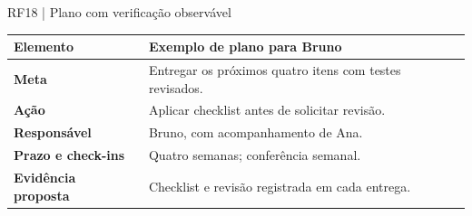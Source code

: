 \documentclass[aspectratio=169,t,xcolor=table]{beamer}
\newcommand{\head}[1]{\textcolor{UFGBlue}{\textbf{#1}}}
\begin{document}
\begin{frame}{RF18 | Plano com verificação observável}

\small
\begin{tabularx}{\textwidth}{@{}L{.24\textwidth}Y@{}}
\toprule\head{Elemento} & \head{Exemplo de plano para Bruno}\\\midrule
\textbf{Meta} & Entregar os próximos quatro itens com testes revisados.\\[.1cm]
\textbf{Ação} & Aplicar checklist antes de solicitar revisão.\\[.1cm]
\textbf{Responsável} & Bruno, com acompanhamento de Ana.\\[.1cm]
\textbf{Prazo e check-ins} & Quatro semanas; conferência semanal.\\[.1cm]
\textbf{Evidência proposta} & Checklist e revisão registrada em cada entrega.\\\bottomrule
\end{tabularx}\par
\vspace{.2cm}

\end{frame}
\end{document}
